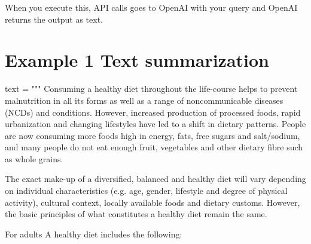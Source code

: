 \documentclass[
  letterpaper,
  DIV=11,
  numbers=noendperiod]{scrreprt}
\newenvironment{Shaded}{\begin{snugshade}}{\end{snugshade}}
\newcommand{\NormalTok}[1]{\textcolor[rgb]{0.00,0.23,0.31}{#1}}
\newcommand{\OperatorTok}[1]{\textcolor[rgb]{0.37,0.37,0.37}{#1}}
\newcommand{\StringTok}[1]{\textcolor[rgb]{0.13,0.47,0.30}{#1}}
\begin{document}
When you execute this, API calls goes to OpenAI with your query and
OpenAI returns the output as text.

\hypertarget{example-1-text-summarization}{%
\section{Example 1 Text
summarization}\label{example-1-text-summarization}}

\begin{Shaded}
\begin{Highlighting}[]
\NormalTok{text }\OperatorTok{=} \StringTok{"""}
\StringTok{Consuming a healthy diet throughout the life{-}course helps to prevent malnutrition in all its forms as well as a range of noncommunicable diseases (NCDs) and conditions. However, increased production of processed foods, rapid urbanization and changing lifestyles have led to a shift in dietary patterns. People are now consuming more foods high in energy, fats, free sugars and salt/sodium, and many people do not eat enough fruit, vegetables and other dietary fibre such as whole grains.}

\StringTok{The exact make{-}up of a diversified, balanced and healthy diet will vary depending on individual characteristics (e.g. age, gender, lifestyle and degree of physical activity), cultural context, locally available foods and dietary customs. However, the basic principles of what constitutes a healthy diet remain the same.}

\StringTok{For adults}
\StringTok{A healthy diet includes the following:}


\end{Highlighting}
\end{Shaded}
\end{document}
